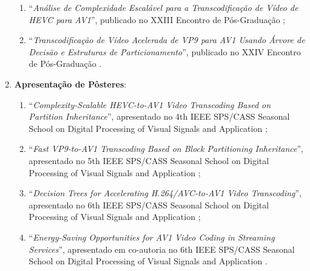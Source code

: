 \begin{enumerate}
\begin{enumerate}
        \item ``\textit{Análise de Complexidade Escalável para a Transcodificação de Vídeo de HEVC para AV1}'', publicado no XXIII Encontro de Pós-Graduação \cite{bib:enpos_2021};

        \item ``\textit{Transcodificação de Vídeo Acelerada de VP9 para AV1 Usando Árvore de Decisão e Estruturas de Particionamento}'', publicado no XXIV Encontro de Pós-Graduação \cite{bib:enpos_2022}.
    \end{enumerate}

    \item \textbf{Apresentação de Pôsteres}:
    \begin{enumerate}
        \item ``\textit{Complexity-Scalable HEVC-to-AV1 Video Transcoding Based on Partition Inheritance}'', apresentado no 4th IEEE SPS/CASS Seasonal School on Digital Processing of Visual Signals and Application \cite{bib:dpvsa_2020}; 

        \item ``\textit{Fast VP9-to-AV1 Transcoding Based on Block Partitioning Inheritance}'', apresentado no 5th IEEE SPS/CASS Seasonal School on Digital Processing of Visual Signals and Application \cite{bib:dpvsa_2021};

        \item ``\textit{Decision Trees for Accelerating H.264/AVC-to-AV1 Video Transcoding}'', apresentado no 6th IEEE SPS/CASS Seasonal School on Digital Processing of Visual Signals and Application \cite{bib:dpvsa_2022};

        \item ``\textit{Energy-Saving Opportunities for AV1 Video Coding in Streaming Services}'', apresentado em co-autoria no 6th IEEE SPS/CASS Seasonal School on Digital Processing of Visual Signals and Application \cite{bib:dpvsa_2022_carol}.
    \end{enumerate}

\end{enumerate}
